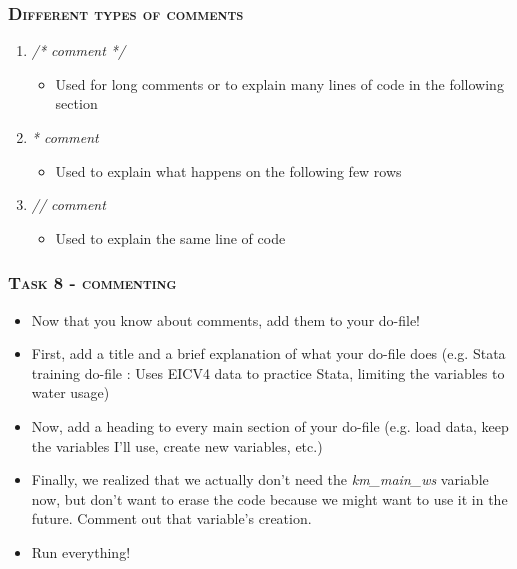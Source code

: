 \documentclass[10pt]{beamer}
\begin{document}
	\begin{frame}
		\frametitle{\textsc{Different types of comments}}
		\begin{center}	
			\Large\textbf{}
		\end{center}	
		\begin{enumerate}	
			 \item \textit{/* comment */} 
			\begin{itemize}
				\item Used for long comments or to explain many lines of code in the following section
			\end{itemize}
			 \item \textit{* comment} 
			\begin{itemize}
				\item Used to explain what happens on the following few rows
			\end{itemize}
			 \item \textit{ // comment} 
			\begin{itemize}
				\item Used to explain the same line of code
			\end{itemize}
		\end{enumerate}
	\end{frame}
	
	
	\begin{frame}
		\frametitle{\textsc{Task 8 - commenting}}

		\begin{itemize}	
			\item Now that you know about comments, add them to your do-file! 
			\onslide<1-> \item First, add a title and a brief explanation of what your do-file does (e.g. Stata training do-file : Uses EICV4 data to practice Stata, limiting the variables to water usage)
			\onslide<2-> \item Now, add a heading to every main section of your do-file (e.g. load data, keep the variables I'll use, create new variables, etc.)
			\onslide<3-> \item Finally, we realized that we actually don't need the \textit{km\_main\_ws}  variable now, but don't want to erase the code because we might want to use it in the future. Comment out that variable's creation.
			\item Run everything!
		\end{itemize}

	\end{frame}
	
\end{document}
